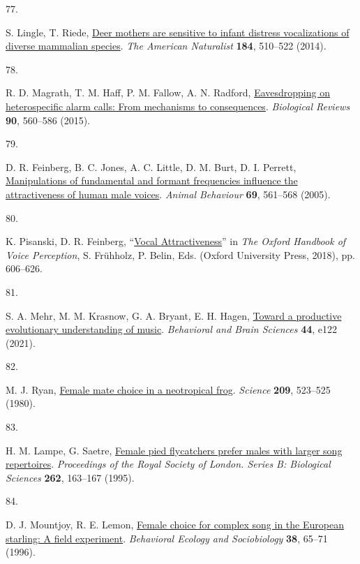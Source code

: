 \documentclass[
]{article}
\newlength{\cslhangindent}
\newlength{\csllabelwidth}
\newenvironment{CSLReferences}[2] %
 {\begin{list}{}{%
  \setlength{\itemindent}{0pt}
  \setlength{\leftmargin}{0pt}
  \setlength{\parsep}{0pt}
  \ifodd #1
   \setlength{\leftmargin}{\cslhangindent}
   \setlength{\itemindent}{-1\cslhangindent}
  \fi
  \setlength{\itemsep}{#2\baselineskip}}}
 {\end{list}}
\newcommand{\CSLLeftMargin}[1]{\parbox[t]{\csllabelwidth}{\strut#1\strut}}
\newcommand{\CSLRightInline}[1]{\parbox[t]{\linewidth - \csllabelwidth}{\strut#1\strut}}
\begin{document}
\begin{CSLReferences}{0}{0}
\CSLLeftMargin{77. }%
\CSLRightInline{S. Lingle, T. Riede,
\href{https://doi.org/10.1086/677677}{Deer mothers are sensitive to
infant distress vocalizations of diverse mammalian species}. \emph{The
American Naturalist} \textbf{184}, 510--522 (2014).}

\CSLLeftMargin{78. }%
\CSLRightInline{R. D. Magrath, T. M. Haff, P. M. Fallow, A. N. Radford,
\href{https://doi.org/10.1111/brv.12122}{Eavesdropping on heterospecific
alarm calls: From mechanisms to consequences}. \emph{Biological Reviews}
\textbf{90}, 560--586 (2015).}

\CSLLeftMargin{79. }%
\CSLRightInline{D. R. Feinberg, B. C. Jones, A. C. Little, D. M. Burt,
D. I. Perrett,
\href{https://doi.org/10.1016/j.anbehav.2004.06.012}{Manipulations of
fundamental and formant frequencies influence the attractiveness of
human male voices}. \emph{Animal Behaviour} \textbf{69}, 561--568
(2005).}

\CSLLeftMargin{80. }%
\CSLRightInline{K. Pisanski, D. R. Feinberg,
{``\href{https://doi.org/10.1093/oxfordhb/9780198743187.013.27}{Vocal
{Attractiveness}}''} in \emph{The {Oxford} {Handbook} of {Voice}
{Perception}}, S. Frühholz, P. Belin, Eds. (Oxford University Press,
2018), pp. 606--626.}

\CSLLeftMargin{81. }%
\CSLRightInline{S. A. Mehr, M. M. Krasnow, G. A. Bryant, E. H. Hagen,
\href{https://doi.org/10.1017/S0140525X21000030}{Toward a productive
evolutionary understanding of music}. \emph{Behavioral and Brain
Sciences} \textbf{44}, e122 (2021).}

\CSLLeftMargin{82. }%
\CSLRightInline{M. J. Ryan,
\href{https://doi.org/10.1126/science.209.4455.523}{Female mate choice
in a neotropical frog}. \emph{Science} \textbf{209}, 523--525 (1980).}

\CSLLeftMargin{83. }%
\CSLRightInline{H. M. Lampe, G. Saetre,
\href{https://doi.org/10.1098/rspb.1995.0191}{Female pied flycatchers
prefer males with larger song repertoires}. \emph{Proceedings of the
Royal Society of London. Series B: Biological Sciences} \textbf{262},
163--167 (1995).}

\CSLLeftMargin{84. }%
\CSLRightInline{D. J. Mountjoy, R. E. Lemon,
\href{https://doi.org/10.1007/s002650050218}{Female choice for complex
song in the {European} starling: A field experiment}. \emph{Behavioral
Ecology and Sociobiology} \textbf{38}, 65--71 (1996).}


\end{CSLReferences}
\end{document}
